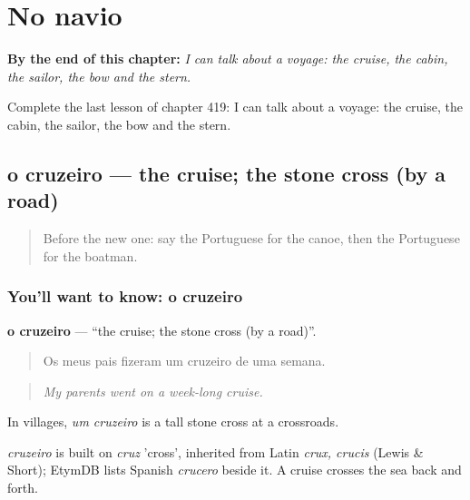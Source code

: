 
\chapter{No navio}
\label{ch:pt-no-navio}

\begin{chapteropening}
\textbf{By the end of this chapter:} \emph{I can talk about a voyage: the cruise, the cabin, the sailor, the bow and the stern.}

Complete the last lesson of chapter 419: I can talk about a voyage: the cruise, the cabin, the sailor, the bow and the stern.
\end{chapteropening}

\section[o cruzeiro]{o cruzeiro — the cruise; the stone cross (by a road)}

\label{lesson:PT-C419-cruzeiro}



\begin{quote}
Before the new one: say the Portuguese for the canoe, then the Portuguese for the boatman.
\end{quote}

\subsection*{You'll want to know: o cruzeiro}
\textbf{o cruzeiro} — \textquotedblleft{}the cruise; the stone cross (by a road)\textquotedblright{}.

\begin{quote}
Os meus pais fizeram um cruzeiro de uma semana.
\end{quote}

\begin{quote}
\emph{My parents went on a week-long cruise.}
\end{quote}

In villages, \emph{um cruzeiro} is a tall stone cross at a crossroads.

\begin{cousinweb}
\emph{cruzeiro} is built on \emph{cruz} 'cross', inherited from Latin \emph{crux, crucis} (Lewis \& Short); EtymDB lists Spanish \emph{crucero} beside it. A cruise crosses the sea back and forth.
\end{cousinweb}

